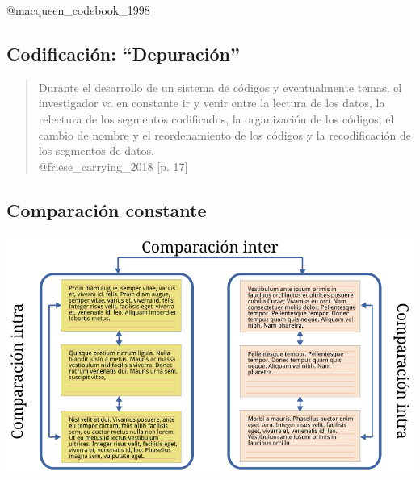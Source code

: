 @macqueen\_codebook\_1998

\hypertarget{codificacion-depuracion}{%
\subsection{Codificación:
``Depuración''}\label{codificacion-depuracion}}

\begin{quote}
Durante el desarrollo de un sistema de códigos y eventualmente temas, el
investigador va en constante ir y venir entre la lectura de los datos,
la relectura de los segmentos codificados, la organización de los
códigos, el cambio de nombre y el reordenamiento de los códigos y la
recodificación de los segmentos de datos.\\
@friese\_carrying\_2018 {[}p. 17{]}
\end{quote}

\hypertarget{comparacion-constante}{%
\subsection{Comparación constante}\label{comparacion-constante}}

\includegraphics{imagenes-cuali/comparacion-constante.png}

\hypertarget{section-1}{%
\subsection{}\label{section-1}}

